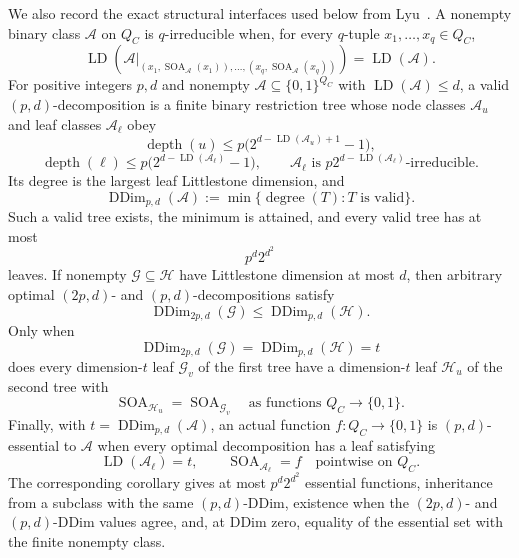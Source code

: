 We also record the exact structural interfaces used below from
Lyu~\citep{lyu2025}.  A nonempty binary class \(\mathcal A\) on \(Q_C\)
is \(q\)-irreducible when, for every \(q\)-tuple
\(x_1,\ldots,x_q\in Q_C\),
\[
 \operatorname{LD}\!\left(
 \mathcal A|_{(x_1,\operatorname{SOA}_{\mathcal A}(x_1)),\ldots,
                    (x_q,\operatorname{SOA}_{\mathcal A}(x_q))}
 \right)
 =\operatorname{LD}(\mathcal A).
\tag{5}
\]
For positive integers \(p,d\) and nonempty
\(\mathcal A\subseteq\{0,1\}^{Q_C}\) with
\(\operatorname{LD}(\mathcal A)\le d\), a valid
\((p,d)\)-decomposition is a finite binary restriction tree whose node
classes \(\mathcal A_u\) and leaf classes \(\mathcal A_\ell\) obey
\[
 \operatorname{depth}(u)
 \le p\bigl(2^{d-\operatorname{LD}(\mathcal A_u)+1}-1\bigr),
\tag{6}
\]
\[
 \operatorname{depth}(\ell)
 \le p\bigl(2^{d-\operatorname{LD}(\mathcal A_\ell)}-1\bigr),
 \qquad
 \mathcal A_\ell\text{ is }
 p2^{d-\operatorname{LD}(\mathcal A_\ell)}
 \text{-irreducible}.
\tag{7}
\]
Its degree is the largest leaf Littlestone dimension, and
\[
 \operatorname{DDim}_{p,d}(\mathcal A)
 :=\min\{\operatorname{degree}(T):T\text{ is valid}\}.
\tag{8}
\]
Such a valid tree exists, the minimum is attained, and every valid tree has
at most
\[
 p^d2^{d^2}
\tag{9}
\]
leaves.  If nonempty \(\mathcal G\subseteq\mathcal H\) have Littlestone
dimension at most \(d\), then arbitrary optimal \((2p,d)\)- and
\((p,d)\)-decompositions satisfy
\[
 \operatorname{DDim}_{2p,d}(\mathcal G)
 \le \operatorname{DDim}_{p,d}(\mathcal H).
\tag{10}
\]
Only when
\[
 \operatorname{DDim}_{2p,d}(\mathcal G)
 =\operatorname{DDim}_{p,d}(\mathcal H)=t
\tag{11}
\]
does every dimension-\(t\) leaf \(\mathcal G_v\) of the first tree have a
dimension-\(t\) leaf \(\mathcal H_u\) of the second tree with
\[
 \operatorname{SOA}_{\mathcal H_u}
 =\operatorname{SOA}_{\mathcal G_v}
 \quad\text{as functions }Q_C\to\{0,1\}.
\tag{12}
\]
Finally, with \(t=\operatorname{DDim}_{p,d}(\mathcal A)\), an actual
function \(f:Q_C\to\{0,1\}\) is \((p,d)\)-essential to \(\mathcal A\)
when every optimal decomposition has a leaf satisfying
\[
 \operatorname{LD}(\mathcal A_\ell)=t,
 \qquad
 \operatorname{SOA}_{\mathcal A_\ell}=f
 \quad\text{pointwise on }Q_C.
\tag{13}
\]
The corresponding corollary gives at most \(p^d2^{d^2}\) essential
functions, inheritance from a subclass with the same \((p,d)\)-DDim,
existence when the \((2p,d)\)- and \((p,d)\)-DDim values agree, and, at
DDim zero, equality of the essential set with the finite nonempty class.

